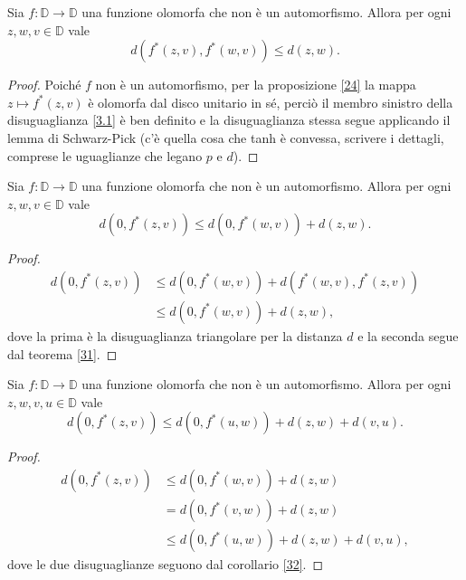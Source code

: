 \begin{thm} \label{31}
  Sia $f:\mathbb{D} \longrightarrow \mathbb{D}$ una funzione olomorfa che non è un automorfismo. Allora per ogni $z, w, v \in \mathbb{D}$ vale
  \begin{equation} \label{3.1}
    d(f^*(z,v),f^*(w,v)) \le d(z,w).
  \end{equation}
\end{thm}


\begin{proof}
  Poiché $f$ non è un automorfismo, per la proposizione \ref{24} la mappa $z \longmapsto f^*(z,v)$ è olomorfa dal disco unitario in sé, perciò il membro sinistro della disuguaglianza \eqref{3.1} è ben definito e la disuguaglianza stessa segue applicando il lemma di Schwarz-Pick (c'è quella cosa che tanh è convessa, scrivere i dettagli, comprese le uguaglianze che legano $p$ e $d$).
\end{proof}

\begin{cor} \label{32}
  Sia $f:\mathbb{D} \longrightarrow \mathbb{D}$ una funzione olomorfa che non è un automorfismo. Allora per ogni $z, w, v \in \mathbb{D}$ vale
  \begin{equation}
    d(0, f^*(z,v)) \le d(0,f^*(w,v))+d(z,w).
  \end{equation}
\end{cor}

\begin{proof}
  \begin{align*}
    d(0,f^*(z,v)) & \le d(0,f^*(w,v))+d(f^*(w,v),f^*(z,v)) \\
    & \le d(0,f^*(w,v))+d(z,w),
  \end{align*}
  dove la prima è la disuguaglianza triangolare per la distanza $d$ e la seconda segue dal teorema \ref{31}.
\end{proof}

\begin{cor} \label{33}
  Sia $f:\mathbb{D} \longrightarrow \mathbb{D}$ una funzione olomorfa che non è un automorfismo. Allora per ogni $z, w, v, u \in \mathbb{D}$ vale
  \begin{equation}
    d(0, f^*(z,v)) \le d(0, f^*(u,w))+d(z,w)+d(v,u).
  \end{equation}
\end{cor}

\begin{proof}
  \begin{align*}
    d(0,f^*(z,v)) & \le d(0,f^*(w,v))+d(z,w) \\
    & =d(0,f^*(v,w))+d(z,w) \\
    & \le d(0,f^*(u,w))+d(z,w)+d(v,u),
  \end{align*}
  dove le due disuguaglianze seguono dal corollario \ref{32}.
\end{proof}

